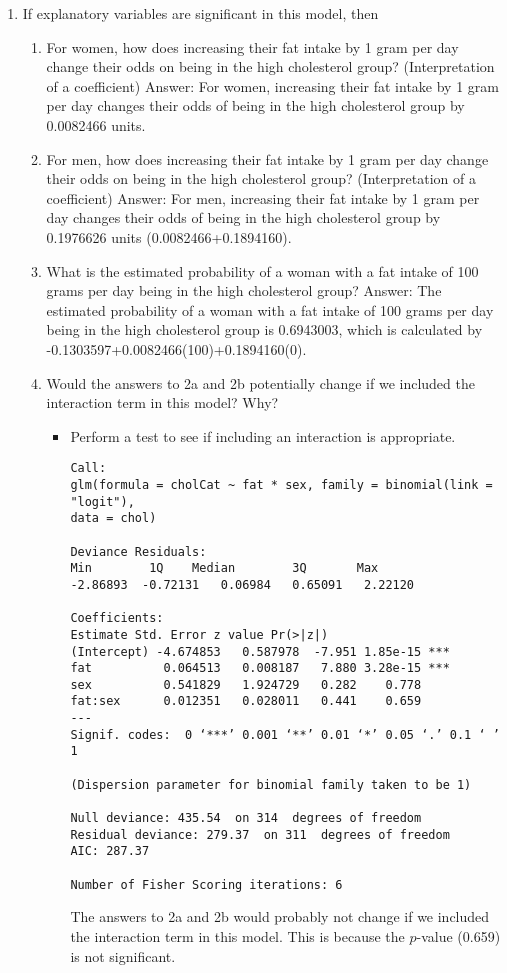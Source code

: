 \documentclass[12pt,letterpaper]{article}
\begin{document}
\begin{enumerate}
	\item
	If explanatory variables are significant in this model, then
	\begin{enumerate}
		\item
		For women, how does increasing their fat intake by 1 gram per day change their odds on being in the high cholesterol group? (Interpretation of a coefficient)
		Answer: For women, increasing their fat intake by 1 gram per day changes their odds of being in the high cholesterol group by 0.0082466 units. 
		\item
		For men, how does increasing their fat intake by 1 gram per day change their odds on being in the high cholesterol group? (Interpretation of a coefficient)
		Answer: For men, increasing their fat intake by 1 gram per day changes their odds of being in the high cholesterol group by 0.1976626 units (0.0082466+0.1894160).
		\item
		What is the estimated probability of a woman with a fat intake of 100 grams per day being in the high cholesterol group? 
		Answer: The estimated probability of a woman with a fat intake of 100 grams per day being in the high cholesterol group is 0.6943003, which is calculated by -0.1303597+0.0082466(100)+0.1894160(0). 
		\item
		Would the answers to 2a and 2b potentially change if we included the interaction term in this model? Why? 
		\begin{itemize}
			\item Perform a test to see if including an interaction is appropriate.
			
\begin{Verbatim}
Call:
glm(formula = cholCat ~ fat * sex, family = binomial(link = "logit"), 
data = chol)

Deviance Residuals: 
Min        1Q    Median        3Q       Max  
-2.86893  -0.72131   0.06984   0.65091   2.22120  

Coefficients:
Estimate Std. Error z value Pr(>|z|)    
(Intercept) -4.674853   0.587978  -7.951 1.85e-15 ***
fat          0.064513   0.008187   7.880 3.28e-15 ***
sex          0.541829   1.924729   0.282    0.778    
fat:sex      0.012351   0.028011   0.441    0.659    
---
Signif. codes:  0 ‘***’ 0.001 ‘**’ 0.01 ‘*’ 0.05 ‘.’ 0.1 ‘ ’ 1

(Dispersion parameter for binomial family taken to be 1)

Null deviance: 435.54  on 314  degrees of freedom
Residual deviance: 279.37  on 311  degrees of freedom
AIC: 287.37

Number of Fisher Scoring iterations: 6
\end{Verbatim} 
			The answers to 2a and 2b would probably not change if we included the interaction term in this model. This is because the $p$-value (0.659) is not significant.
		\end{itemize}
	\end{enumerate}
\end{enumerate}
\newpage
\end{document}
